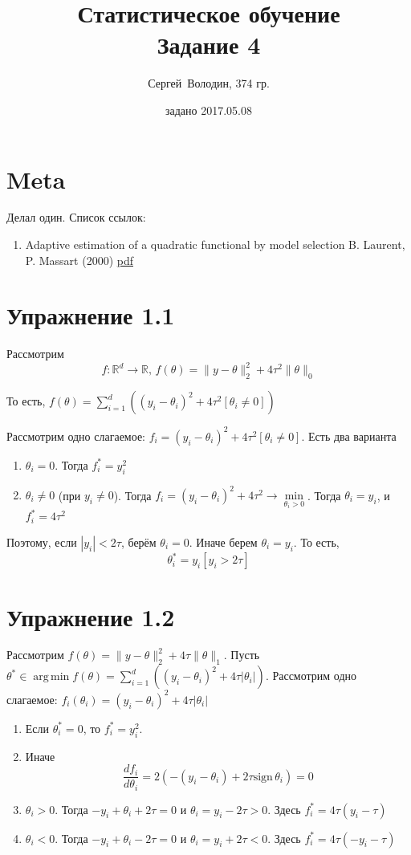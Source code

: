 \documentclass[a4paper]{article}
\title{Статистическое обучение\\Задание 4}
\date{задано 2017.05.08}
\author{Сергей~Володин, 374 гр.}
\DeclareMathOperator*{\argmin}{arg\,min}
\newcommand{\sign}{\mbox{sign}\,}
\newcommand{\R}{\mathbb{R}}
\begin{document}
\maketitle
\section*{Meta}
Делал один. Список ссылок:
\begin{enumerate}
\item
Adaptive estimation of a quadratic functional by model selection
B. Laurent, P. Massart (2000)
\href{http://projecteuclid.org/download/pdf_1/euclid.aos/1015957395}{pdf}
\end{enumerate}
\section*{Упражнение 1.1}
Рассмотрим
$$f\colon \R^d\to \R,\,f(\theta)=\|y-\theta\|_2^2+4\tau^2\|\theta\|_0$$

То есть, $f(\theta)=\sum\limits_{i=1}^d\left((y_i-\theta_i)^2+4\tau^2[\theta_i\neq0]\right)$

Рассмотрим одно слагаемое: $f_i=(y_i-\theta_i)^2+4\tau^2[\theta_i\neq 0]$. Есть два варианта\begin{enumerate}
	\item $\theta_i=0$. Тогда $f^*_i=y_i^2$
	\item $\theta_i\neq 0$ (при $y_i\neq 0$). Тогда $f_i=(y_i-\theta_i)^2+4\tau^2\to\min\limits_{\theta_i>0}$. Тогда $\theta_i=y_i$, и $f^*_i=4\tau^2$
\end{enumerate}
Поэтому, если $|y_i|<2\tau$, берём $\theta_i=0$. Иначе берем $\theta_i=y_i$. То есть,
$$
\theta_i^*=y_i[y_i>2\tau]
$$
\section*{Упражнение 1.2}
Рассмотрим $f(\theta)=\|y-\theta\|_2^2+4\tau\|\theta\|_1$. Пусть $\theta^*\in\argmin f(\theta)=\sum\limits_{i=1}^d\left((y_i-\theta_i)^2+4\tau |\theta_i|\right)$.
Рассмотрим одно слагаемое: $f_i(\theta_i)=(y_i-\theta_i)^2+4\tau|\theta_i|$
\begin{enumerate}
	\item Если $\theta_i^*=0$, то $f_i^*=y_i^2$.
	\item Иначе
$$\frac{d f_i}{d \theta_i}=2(-(y_i-\theta_i)+2\tau \sign\theta_i)=0$$
\item $\theta_i>0$. Тогда $-y_i+\theta_i+2\tau=0$ и $\theta_i=y_i-2\tau>0$. Здесь $f_i^*=4\tau(y_i-\tau)$
\item $\theta_i<0$. Тогда $-y_i+\theta_i-2\tau=0$ и $\theta_i=y_i+2\tau<0$. Здесь $f_i^*=4\tau (-y_i-\tau)$
\end{enumerate}
\end{document}
